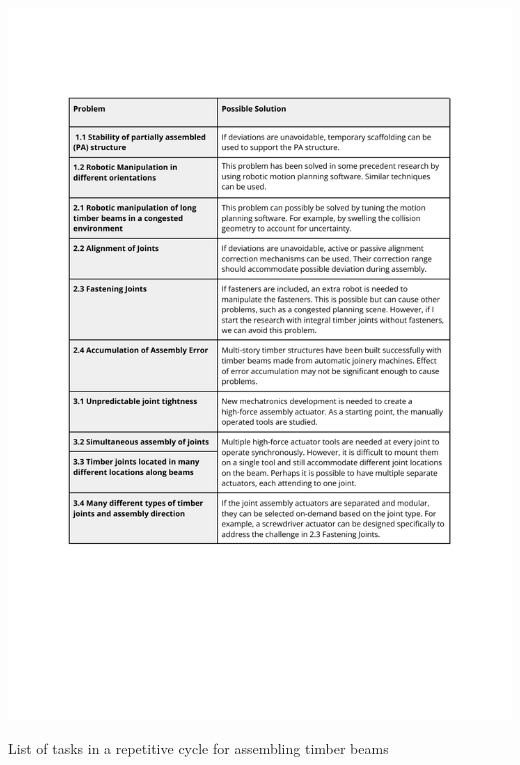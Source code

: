 \begin{table}[H]
    \includegraphics[page=2, trim=25.4mm 100mm 25.4mm 33mm, clip, width=\textwidth]{tables/Tables in Chapter 4.pdf}
    \caption{List of tasks in a repetitive cycle for assembling timber beams}
    \label{table:list-of-assembly-tasks}
\end{table}


